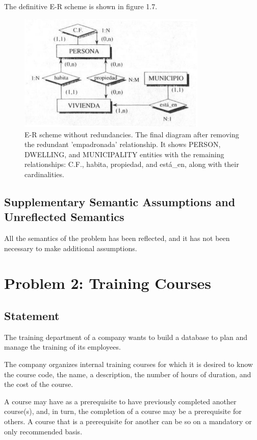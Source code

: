 \documentclass{article}
\begin{document}
The definitive E-R scheme is shown in figure 1.7.

\begin{figure}
    \centering
    \includegraphics[width=0.8\textwidth]{figures/fig7}
    \caption{E-R scheme without redundancies. The final diagram after removing the redundant 'empadronada' relationship. It shows PERSON, DWELLING, and MUNICIPALITY entities with the remaining relationships: C.F., habita, propiedad, and está\_en, along with their cardinalities.}
    \label{fig:fig1.7}
\end{figure}

\subsection*{
Supplementary Semantic Assumptions and Unreflected Semantics
}

All the semantics of the problem has been reflected, and it has not been necessary to make additional assumptions.

\section{Problem 2: Training Courses}

\subsection{Statement}

The training department of a company wants to build a database to plan and manage the training of its employees.

The company organizes internal training courses for which it is desired to know the course code, the name, a description, the number of hours of duration, and the cost of the course.

A course may have as a prerequisite to have previously completed another course(s), and, in turn, the completion of a course may be a prerequisite for others.  A course that is a prerequisite for another can be so on a mandatory or only recommended basis.
\end{document}
